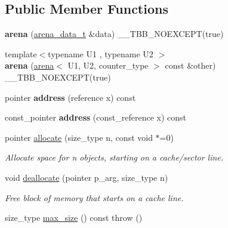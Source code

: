 \subsection*{Public Member Functions}
\begin{DoxyCompactItemize}
\item 
\hypertarget{structarena_a80b95978a839c579329b0f7abbcce697}{}{\bfseries arena} (\hyperlink{structarena__data}{arena\+\_\+data\+\_\+t} \&data) \+\_\+\+\_\+\+T\+B\+B\+\_\+\+N\+O\+E\+X\+C\+E\+P\+T(true)\label{structarena_a80b95978a839c579329b0f7abbcce697}

\item 
\hypertarget{structarena_a774da8798d8957931896c4feef7ec6b7}{}{\footnotesize template$<$typename U1 , typename U2 $>$ }\\{\bfseries arena} (\hyperlink{structarena}{arena}$<$ U1, U2, counter\+\_\+type $>$ const \&other) \+\_\+\+\_\+\+T\+B\+B\+\_\+\+N\+O\+E\+X\+C\+E\+P\+T(true)\label{structarena_a774da8798d8957931896c4feef7ec6b7}

\item 
\hypertarget{structarena_af04b43fe1df49cf477f123f541d600e1}{}pointer {\bfseries address} (reference x) const \label{structarena_af04b43fe1df49cf477f123f541d600e1}

\item 
\hypertarget{structarena_ab4d7aea03076149312c1d1e25021d6f5}{}const\+\_\+pointer {\bfseries address} (const\+\_\+reference x) const \label{structarena_ab4d7aea03076149312c1d1e25021d6f5}

\item 
\hypertarget{structarena_acfb5c93cf227312ad40872fc2cf319d4}{}pointer \hyperlink{structarena_acfb5c93cf227312ad40872fc2cf319d4}{allocate} (size\+\_\+type n, const void $\ast$=0)\label{structarena_acfb5c93cf227312ad40872fc2cf319d4}

\begin{DoxyCompactList}\small\item\em Allocate space for n objects, starting on a cache/sector line. \end{DoxyCompactList}\item 
\hypertarget{structarena_a9d9c7f28c78c9ddc9ea47f54e4280f70}{}void \hyperlink{structarena_a9d9c7f28c78c9ddc9ea47f54e4280f70}{deallocate} (pointer p\+\_\+arg, size\+\_\+type n)\label{structarena_a9d9c7f28c78c9ddc9ea47f54e4280f70}

\begin{DoxyCompactList}\small\item\em Free block of memory that starts on a cache line. \end{DoxyCompactList}\item 
\hypertarget{structarena_aa316fcf273306fd67d522de05b1036a4}{}size\+\_\+type \hyperlink{structarena_aa316fcf273306fd67d522de05b1036a4}{max\+\_\+size} () const   throw ()\label{structarena_aa316fcf273306fd67d522de05b1036a4}


\end{DoxyCompactItemize}
